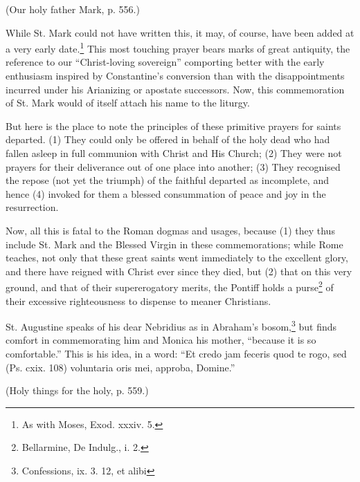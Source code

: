 (Our holy father Mark, p. 556.)

While St. Mark could not have written this, it may, of course, have been added at a very early date.\footnote{\par  As with Moses, Exod. xxxiv. 5.} This most touching prayer bears marks of great antiquity, the reference to our “Christ-loving sovereign” comporting better with the early enthusiasm inspired by Constantine’s conversion than with the disappointments incurred under his Arianizing or apostate successors. Now, this commemoration of St. Mark would of itself attach his name to the liturgy.

But here is the place to note the principles of these primitive prayers for saints departed. (1) They could only be offered in behalf of the holy dead who had fallen asleep in full communion with Christ and His Church; (2) They were not prayers for their deliverance out of one place into another; (3) They recognised the repose (not yet the triumph) of the faithful departed as incomplete, and hence (4) invoked for them a blessed consummation of peace and joy in the resurrection.

Now, all this is fatal to the Roman dogmas and usages, because (1) they thus include St. Mark and the Blessed Virgin in these commemorations; while Rome teaches, not only that these great saints went immediately to the excellent glory, and there have reigned with Christ ever since they died, but (2) that on this very ground, and that of their supererogatory merits, the Pontiff holds a purse\footnote{\par  Bellarmine, De Indulg., i. 2.} of their excessive righteousness to dispense to meaner Christians.

St. Augustine speaks of his dear Nebridius as in Abraham’s bosom,\footnote{\par  Confessions, ix. 3. 12, et alibi} but finds comfort in commemorating him and Monica his mother, “because it is so comfortable.” This is his idea, in a word: “Et credo jam feceris quod te rogo, sed (Ps. cxix. 108) voluntaria oris mei, approba, Domine.”

(Holy things for the holy, p. 559.)

